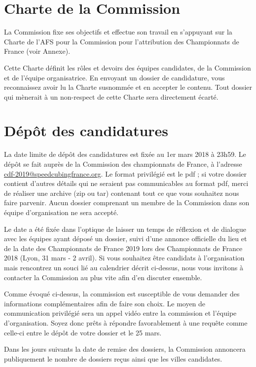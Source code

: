 \documentclass[a4paper,12pt]{scrartcl}
\begin{document}
\section*{Charte de la Commission}
La Commission fixe ses objectifs et effectue son travail en s'appuyant sur la Charte de l'AFS pour la Commission pour l'attribution des Championnats de France (voir Annexe).
 
Cette Charte définit les rôles et devoirs des équipes candidates, de la Commission et de l'équipe organisatrice. En envoyant un dossier de candidature, vous reconnaissez avoir lu la Charte susnommée et en accepter le contenu. Tout dossier qui mènerait à un non-respect de cette Charte sera directement écarté.


\section*{Dépôt des candidatures}

La date limite de dépôt des candidatures est fixée au 1er mars 2018 à 23h59. Le dépôt se fait auprès de la Commission des championnats de France, à l'adresse \href{mailto:cdf-2019@speedcubingfrance.org}{cdf-2019@speedcubingfrance.org}.
Le format privilégié est le pdf ; si votre dossier contient d'autres détails qui ne seraient pas communicables au format pdf, merci de réaliser une archive (zip ou tar) contenant tout ce que vous souhaitez nous faire parvenir. Aucun dossier comprenant un membre de la Commission dans son équipe d'organisation ne sera accepté.

Le date a été fixée dans l'optique de laisser un temps de réflexion et de dialogue avec les équipes ayant déposé un dossier, suivi d'une annonce officielle du lieu et de la date des Championnats de France 2019 lors des Championnats de France 2018 (Lyon, 31 mars - 2 avril). Si vous souhaitez être candidats à l'organisation mais rencontrez un souci lié au calendrier décrit ci-dessus, nous vous invitons à contacter la Commission au plus vite afin d'en discuter ensemble.

Comme évoqué ci-dessus, la commission est susceptible de vous demander des informations complémentaires afin de faire son choix. Le moyen de communication privilégié sera un appel vidéo entre la commission et l'équipe d'organisation. Soyez donc prêts à répondre favorablement à une requête comme celle-ci entre le dépôt de votre dossier et le 25 mars.

Dans les jours suivants la date de remise des dossiers, la Commission annoncera publiquement le nombre de dossiers reçus ainsi que les villes candidates.
\end{document}
